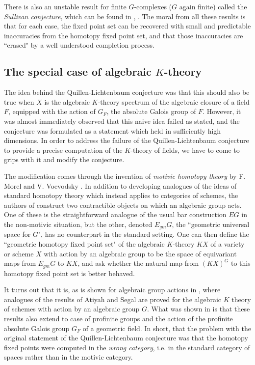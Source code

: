 \documentclass[11pt]{article}
\begin{document}
There is also an unstable result for finite $G$-complexes ($G$ again finite)  called the {\em Sullivan conjecture}, which can be found in  \cite{sullivanconj}, \cite{sullivanconj2}. The moral from all these results is that for each case, the fixed point set can be recovered with small and predictable inaccuracies from the homotopy fixed point set, and that those inaccuracies are  ``erased" by a well understood completion process.
\subsection{The special case of algebraic $K$-theory}

The idea behind the Quillen-Lichtenbaum conjecture was that this should also be true when $X$ is the algebraic $K$-theory spectrum of the algebraic closure of a field $F$, equipped with the action of $G_F$, the absolute Galois group of $F$.  However, it was almost immediately observed that this naive idea failed as stated, and the conjecture was formulated as a statement which held in sufficiently high dimensions. In order to address the failure of the Quillen-Lichtenbaum conjecture to provide a precise  computation of the $K$-theory of fields, we have to come to grips with it  and   modify  the conjecture. 


 The modification  comes through the invention of {\em motivic homotopy theory} by F. Morel and V. Voevodsky \cite{motivichomotopy}.  In addition to developing analogues of the ideas of standard homotopy theory which instead applies to categories of schemes, the authors of \cite{motivichomotopy} construct two contractible objects on which an algebraic group acts.  One of these is the straightforward analogue of the usual bar construction  $EG$ in the non-motivic situation, but the other, denoted $E_{gm}G$, the ``geometric universal space for $G$",  has no counterpart in the standard setting. One can then define the ``geometric homotopy fixed  point set" of the algebraic $K$-theory $KX$ of a variety or scheme $X$ with action by an algebraic group  to be the space of equivariant maps from $E_{gm}G$ to $KX$, and ask whether the natural map from $(KX)^G$ to this homotopy fixed point set is better behaved. 
 
 It turns out that it is, as is shown for algebraic group actions in \cite{royg2}, where analogues of the results of Atiyah and Segal \cite{atiyahsegal} are proved for the algebraic $K$ theory of schemes with action by an algebraic group $G$. What was shown  in \cite{royg4} is that these results also extend to case of profinite groups and the action of the profinite absolute Galois group $G_F$ of a geometric field.  In short, that the problem with the original statement of the Quillen-Lichtenbaum conjecture was that the homotopy fixed points  were computed in the {\em wrong category}, i.e. in the standard category of spaces rather than in the motivic category.
\end{document}

